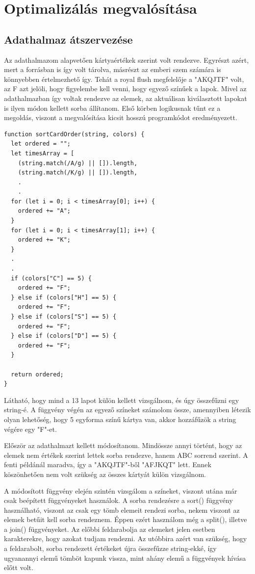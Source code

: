 \section{Optimalizálás megvalósítása}

\subsection{Adathalmaz átszervezése}
Az adathalmazom alapvetően kártyaértékek szerint volt rendezve. Egyrészt azért, mert a forrásban is így volt tárolva, másrészt az emberi szem számára is könnyebben értelmezhető így. Tehát a royal flush megfelelője a "AKQJTF" volt, az F azt jelöli, hogy figyelembe kell venni, hogy egyező színűek a lapok. Mivel az adathalmazban így voltak rendezve az elemek, az aktuálisan kiválasztott lapokat is ilyen módon kellett sorba állítanom. Első körben logikusnak tűnt ez a megoldás, viszont a megvalósítása kicsit hosszú programkódot eredményezett. 

\begin{lstlisting}[style=htmlcssjs]
function sortCardOrder(string, colors) {
  let ordered = "";
  let timesArray = [
    (string.match(/A/g) || []).length,
    (string.match(/K/g) || []).length,
    .
    .
  for (let i = 0; i < timesArray[0]; i++) {
    ordered += "A";
  }
  for (let i = 0; i < timesArray[1]; i++) {
    ordered += "K";
  }
  .
  .
  if (colors["C"] == 5) {
    ordered += "F";
  } else if (colors["H"] == 5) {
    ordered += "F";
  } else if (colors["S"] == 5) {
    ordered += "F";
  } else if (colors["D"] == 5) {
    ordered += "F";
  }

  return ordered;
}
\end{lstlisting}

Látható, hogy mind a 13 lapot külön kellett vizsgálnom, és úgy összefűzni egy string-é. A függvény végén az egyező színeket számolom össze, amennyiben létezik olyan lehetőség, hogy 5 egyforma színű kártya van, akkor hozzáfűzök a string végére egy "F"-et.

Először az adathalmazt kellett módosítanom. Mindössze annyi történt, hogy az elemek nem értékek szerint lettek sorba rendezve, hanem ABC sorrend szerint. A fenti példánál maradva, így a "AKQJTF"-ből "AFJKQT" lett. Ennek köszönhetően nem volt szükség az összes kártyát külön vizsgálnom.

A módosított függvény elején szintén vizsgálom a színeket, viszont utána már csak beépített függvényeket használok. A sorba rendezésre a sort() függvény használható, viszont az csak egy tömb elemeit rendezi sorba, nekem viszont az elemek betűit kell sorba rendeznem. Éppen ezért használom még a split(), illetve a join() függvényeket. Az előbbi feldarabolja az elemeket jelen esetben karakterekre, hogy azokat tudjam rendezni. Az utóbbira azért van szükség, hogy a feldarabolt, sorba rendezett értékeket újra összefűzze string-ekké, így ugyanannyi elemű tömböt kapunk vissza, mint ahány elemű a függvények hívása előtt volt. 

